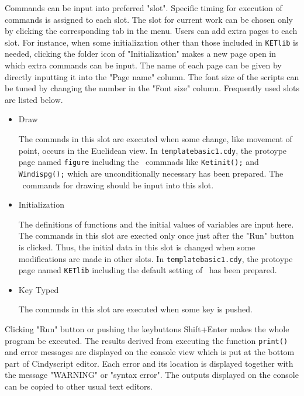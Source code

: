 \documentclass[papersize,a4paper,12pt]{article}
\begin{document}
Commands can be input into preferred "slot". 
Specific timing for execution of commands 
is assigned to each slot. 
The slot for current work can be chosen 
only by clicking the corresponding tab in the menu. 
Users can add extra pages to each slot. 
For instance, 
when some initialization other than 
those included in \verb|KETlib| is needed, 
clicking the folder icon of "Initialization" makes a new page open 
in which extra commands can be input. 
The name of each page can be given 
by directly inputting it into the "Page name" column. 
The font size of the scripts can be tuned 
by changing the number in the "Font size" column. 
Frequently used slots are listed below. 

\begin{itemize}

\item 
Draw

The commnds in this slot are executed 
when some change, like movement of point, 
occurs in the Euclidean view. 
In \verb|templatebasic1.cdy|, 
the protoype page named \verb|figure| 
including the \ketcindy\ commnads 
like \verb|Ketinit();| and \verb|Windispg();| 
which are unconditionally necessary 
has been prepared.  
The \ketcindy\ commands for drawing 
should be input into this slot. 

\item 
Initialization 

The definitions of functions 
and the initial values of variables 
are input here. 
The commands in this slot are exected 
only once just after the "Run" button is clicked. 
Thus, the initial data in this slot is changed 
when some modifications are made in other slots. 
In \verb|templatebasic1.cdy|, 
the protoype page named \verb|KETlib| 
including the default setting of \ketcindy\ 
has been prepared. 

\item 
Key Typed

The commnds in this slot are executed 
when some key is pushed. 

\end{itemize}

Clicking "Run" button or pushing the keybuttons Shift+Enter 
makes the whole program be executed. 
The results derived from executing the function \verb|print()| 
and error messages are displayed on the console view 
which is put at the bottom part of Cindyscript editor. 
Each error and its location 
is displayed together with the message 
"WARNING" or "syntax error". 
The outputs displayed on the console 
can be copied to other usual text editors. 
\end{document}
